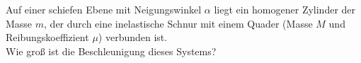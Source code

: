 \begin{Exercise}[label = Zylinder und Quader, origin = IPHO 1968, difficulty = 3, title = Zylinder und Quader]
Auf einer schiefen Ebene mit Neigungswinkel $\alpha$ liegt ein homogener Zylinder der Masse $m$, der durch eine inelastische Schnur mit einem Quader (Masse $M$ und Reibungskoeffizient $\mu$) verbunden ist.\\ Wie groß ist die Beschleunigung dieses Systems?
\end{Exercise}